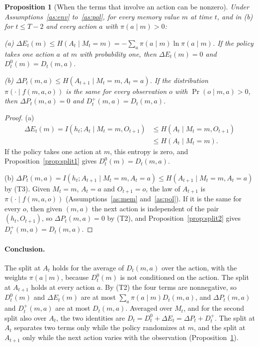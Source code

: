\documentclass{article}
\newtheorem{proposition}{Proposition}[section]
\theoremstyle{definition}
\newcommand{\dE}{\Delta E}
\newcommand{\dP}{\Delta P}
\newcommand{\why}[1]{\tag*{\small(#1)}}
\begin{document}
\begin{proposition}[When the terms that involve an action can be nonzero]\label{prop:signal}
Under Assumptions~\ref{as:env} to~\ref{as:pol}, for every memory value $m$ at time $t$, and in (b) for $t\le T-2$ and every action $a$ with $\pi(a\mid m)>0$:

(a) $\dE_t(m)\le H(A_t\mid M_t=m)=-\sum_a\pi(a\mid m)\ln\pi(a\mid m)$. If the policy takes one action $a$ at $m$ with probability one, then $\dE_t(m)=0$ and $D^0_t(m)=D_t(m,a)$.

(b) $\dP_t(m,a)\le H(A_{t+1}\mid M_t=m,A_t=a)$. If the distribution $\pi(\cdot\mid f(m,a,o))$ is the same for every observation $o$ with $\Pr(o\mid m,a)>0$, then $\dP_t(m,a)=0$ and $D^+_t(m,a)=D_t(m,a)$.
\end{proposition}

\begin{proof}
(a)
\begin{align*}
\dE_t(m)=I(h_t;A_t\mid M_t=m,O_{t+1})&\le H(A_t\mid M_t=m,O_{t+1}) \why{T3}\\
&\le H(A_t\mid M_t=m) \why{T3}.
\end{align*}
If the policy takes one action at $m$, this entropy is zero, and Proposition~\ref{prop:split1} gives $D^0_t(m)=D_t(m,a)$.

(b) $\dP_t(m,a)=I(h_t;A_{t+1}\mid M_t=m,A_t=a)\le H(A_{t+1}\mid M_t=m,A_t=a)$ by (T3). Given $M_t=m$, $A_t=a$ and $O_{t+1}=o$, the law of $A_{t+1}$ is $\pi(\cdot\mid f(m,a,o))$ (Assumptions~\ref{as:mem} and~\ref{as:pol}). If it is the same for every $o$, then given $(m,a)$ the next action is independent of the pair $(h_t,O_{t+1})$, so $\dP_t(m,a)=0$ by (T2), and Proposition~\ref{prop:split2} gives $D^+_t(m,a)=D_t(m,a)$.
\end{proof}

\paragraph{Conclusion.} The split at $A_t$ holds for the average of $D_t(m,a)$ over the action, with the weights $\pi(a\mid m)$, because $D^0_t(m)$ is not conditioned on the action. The split at $A_{t+1}$ holds at every action $a$. By (T2) the four terms are nonnegative, so $D^0_t(m)$ and $\dE_t(m)$ are at most $\sum_a\pi(a\mid m)D_t(m,a)$, and $\dP_t(m,a)$ and $D^+_t(m,a)$ are at most $D_t(m,a)$. Averaged over $M_t$, and for the second split also over $A_t$, the two identities are $D_t=D^0_t+\dE_t=\dP_t+D^+_t$. The split at $A_t$ separates two terms only while the policy randomizes at $m$, and the split at $A_{t+1}$ only while the next action varies with the observation (Proposition~\ref{prop:signal}).
\end{document}
